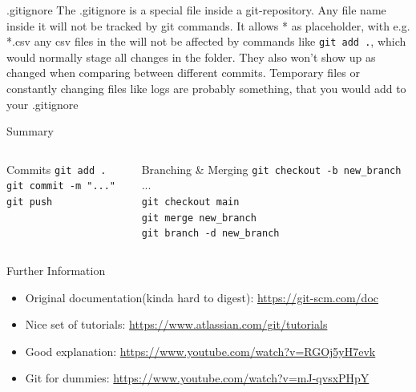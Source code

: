 \documentclass[en]{sdqbeamer}
\begin{document}
\begin{frame}{.gitignore}
The .gitignore is a special file inside a git-repository. Any file name inside it will not be tracked by git commands. It allows * as placeholder, with e.g. *.csv any csv files in the will not be affected by commands like \lstinline{git add .}, which would normally stage all changes in the folder. They also won't show up as changed when comparing between different commits. Temporary files or constantly changing files like logs are probably something, that you would add to your .gitignore
    
\end{frame}

\begin{frame}{Summary}
\begin{columns}[t]
\begin{column}{0.45\textwidth}
\begin{block}{Commits}
\lstinline{git add .}\\
\lstinline{git commit -m "..."}\\
\lstinline{git push}
\end{block}
\end{column}

\begin{column}{0.45\textwidth}
\begin{block}{Branching \& Merging}
\lstinline{git checkout -b new_branch}\\
...\\
\lstinline{git checkout main}\\
\lstinline{git merge new_branch}\\
\lstinline{git branch -d new_branch}
\end{block}
\end{column}
\end{columns}
    
\end{frame}

\begin{frame}{Further Information}
    \begin{itemize}
        \item Original documentation(kinda hard to digest): \url{https://git-scm.com/doc}
        \item Nice set of tutorials: \url{https://www.atlassian.com/git/tutorials}
        \item Good explanation: \url{https://www.youtube.com/watch?v=RGOj5yH7evk}
        \item Git for dummies: \url{https://www.youtube.com/watch?v=mJ-qvsxPHpY}
    \end{itemize}
\end{frame}
\end{document}
